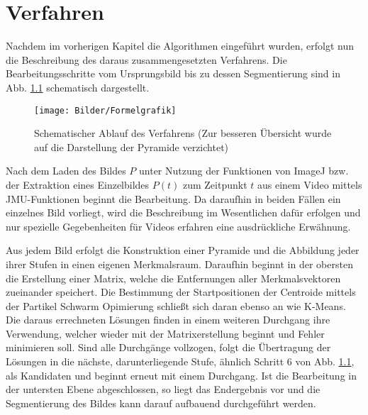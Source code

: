 \chapter{Verfahren}\label{Verfahren}
  Nachdem im vorherigen Kapitel die Algorithmen eingeführt wurden, erfolgt nun die Beschreibung des daraus zusammengesetzten Verfahrens. Die Bearbeitungsschritte vom Ursprungsbild bis zu dessen Segmentierung sind in Abb. \ref{Formelgrafik} schematisch dargestellt.
  \begin{figure}[!b]
    \centering
    \texttt{[image: Bilder/Formelgrafik]}
    \caption{Schematischer Ablauf des Verfahrens (Zur besseren Übersicht wurde auf die Darstellung der Pyramide verzichtet)}
    \label{Formelgrafik}
  \end{figure}

  Nach dem Laden des Bildes $P$ unter Nutzung der Funktionen von ImageJ bzw. der Extraktion eines Einzelbildes $P(t)$ zum Zeitpunkt $t$ aus einem Video mittels JMU-Funktionen beginnt die Bearbeitung. Da daraufhin in beiden Fällen ein einzelnes Bild vorliegt, wird die Beschreibung im Wesentlichen dafür erfolgen und nur spezielle Gegebenheiten für Videos erfahren eine ausdrückliche Erwähnung.

   Aus jedem Bild erfolgt die Konstruktion einer Pyramide und die Abbildung jeder ihrer Stufen in einen eigenen Merkmalsraum. Daraufhin beginnt in der obersten die Erstellung einer Matrix, welche die Entfernungen aller Merkmalsvektoren zueinander speichert. Die Bestimmung der Startpositionen der Centroide mittels der Partikel Schwarm Opimierung schließt sich daran ebenso an wie K-Means. Die daraus errechneten Lösungen finden in einem weiteren Durchgang ihre Verwendung, welcher wieder mit der Matrixerstellung beginnt und Fehler minimieren soll. Sind alle Durchgänge vollzogen, folgt die Übertragung der Lösungen in die nächste, darunterliegende Stufe, ähnlich Schritt 6 von Abb. \ref{Formelgrafik},  als Kandidaten und beginnt erneut mit einem Durchgang.  
   Ist die Bearbeitung in der untersten Ebene abgeschlossen, so liegt das Endergebnis vor und die Segmentierung des Bildes kann darauf aufbauend durchgeführt werden.
\pagebreak
